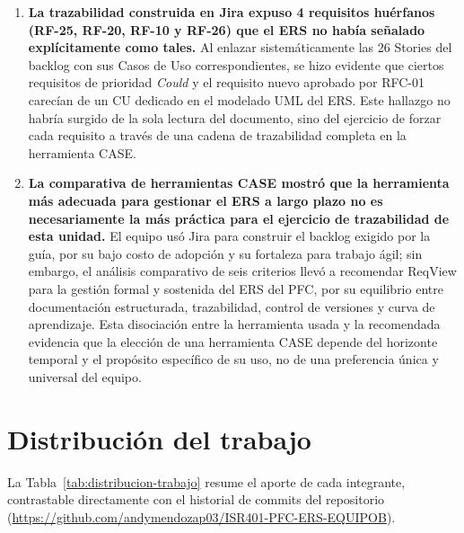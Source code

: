 \documentclass[journal,onecolumn]{IEEEtran}
\begin{document}
\begin{enumerate}[label=\textbf{\arabic*.}, leftmargin=*]
		\item \textbf{La trazabilidad construida en Jira expuso 4 requisitos huérfanos (RF-25, RF-20, RF-10 y RF-26) que el ERS no había señalado explícitamente como tales.} Al enlazar sistemáticamente las 26 Stories del backlog con sus Casos de Uso correspondientes, se hizo evidente que ciertos requisitos de prioridad \textit{Could} y el requisito nuevo aprobado por RFC-01 carecían de un CU dedicado en el modelado UML del ERS. Este hallazgo no habría surgido de la sola lectura del documento, sino del ejercicio de forzar cada requisito a través de una cadena de trazabilidad completa en la herramienta CASE.
		
		\item \textbf{La comparativa de herramientas CASE mostró que la herramienta más adecuada para gestionar el ERS a largo plazo no es necesariamente la más práctica para el ejercicio de trazabilidad de esta unidad.} El equipo usó Jira para construir el backlog exigido por la guía, por su bajo costo de adopción y su fortaleza para trabajo ágil; sin embargo, el análisis comparativo de seis criterios llevó a recomendar ReqView para la gestión formal y sostenida del ERS del PFC, por su equilibrio entre documentación estructurada, trazabilidad, control de versiones y curva de aprendizaje. Esta disociación entre la herramienta usada y la recomendada evidencia que la elección de una herramienta CASE depende del horizonte temporal y el propósito específico de su uso, no de una preferencia única y universal del equipo.
		
	\end{enumerate}
	
	\newpage
	\section{Distribución del trabajo}
	
	La Tabla~\ref{tab:distribucion-trabajo} resume el aporte de cada integrante, contrastable directamente con el historial de commits del repositorio (\url{https://github.com/andymendozap03/ISR401-PFC-ERS-EQUIPOB}).
	
\end{document}
